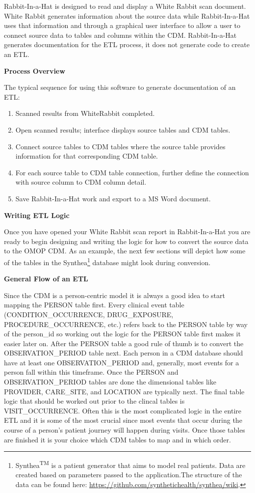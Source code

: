 \documentclass[11pt]{book}
\providecommand{\tightlist}{%
  \setlength{\itemsep}{0pt}\setlength{\parskip}{0pt}}
\let\rmarkdownfootnote\footnote%
\def\footnote{\protect\rmarkdownfootnote}
\theoremstyle{definition}
\theoremstyle{definition}
\theoremstyle{definition}
\theoremstyle{remark}
\begin{document}
Rabbit-In-a-Hat is designed to read and display a White Rabbit scan document. White Rabbit generates information about the source data while Rabbit-In-a-Hat uses that information and through a graphical user interface to allow a user to connect source data to tables and columns within the CDM. Rabbit-In-a-Hat generates documentation for the ETL process, it does not generate code to create an ETL.

\textbf{Process Overview}

The typical sequence for using this software to generate documentation of an ETL:

\begin{enumerate}
\def\labelenumi{\arabic{enumi}.}
\tightlist
\item
  Scanned results from WhiteRabbit completed.
\item
  Open scanned results; interface displays source tables and CDM tables.
\item
  Connect source tables to CDM tables where the source table provides information for that corresponding CDM table.
\item
  For each source table to CDM table connection, further define the connection with source column to CDM column detail.
\item
  Save Rabbit-In-a-Hat work and export to a MS Word document.
\end{enumerate}

\textbf{Writing ETL Logic}

Once you have opened your White Rabbit scan report in Rabbit-In-a-Hat you are ready to begin designing and writing the logic for how to convert the source data to the OMOP CDM. As an example, the next few sections will depict how some of the tables in the Synthea\footnote{Synthea\textsuperscript{TM} is a patient generator that aims to model real patients. Data are created based on parameters passed to the application.The structure of the data can be found here: \url{https://github.com/synthetichealth/synthea/wiki}.} database might look during conversion.

\textbf{General Flow of an ETL}

Since the CDM is a person-centric model it is always a good idea to start mapping the PERSON table first. Every clinical event table (CONDITION\_OCCURRENCE, DRUG\_EXPOSURE, PROCEDURE\_OCCURRENCE, etc.) refers back to the PERSON table by way of the person\_id so working out the logic for the PERSON table first makes it easier later on. After the PERSON table a good rule of thumb is to convert the OBSERVATION\_PERIOD table next. Each person in a CDM database should have at least one OBSERVATION\_PERIOD and, generally, most events for a person fall within this timeframe. Once the PERSON and OBSERVATION\_PERIOD tables are done the dimensional tables like PROVIDER, CARE\_SITE, and LOCATION are typically next. The final table logic that should be worked out prior to the clincal tables is VISIT\_OCCURRENCE. Often this is the most complicated logic in the entire ETL and it is some of the most crucial since most events that occur during the course of a person's patient journey will happen during visits. Once those tables are finished it is your choice which CDM tables to map and in which order.
\end{document}
